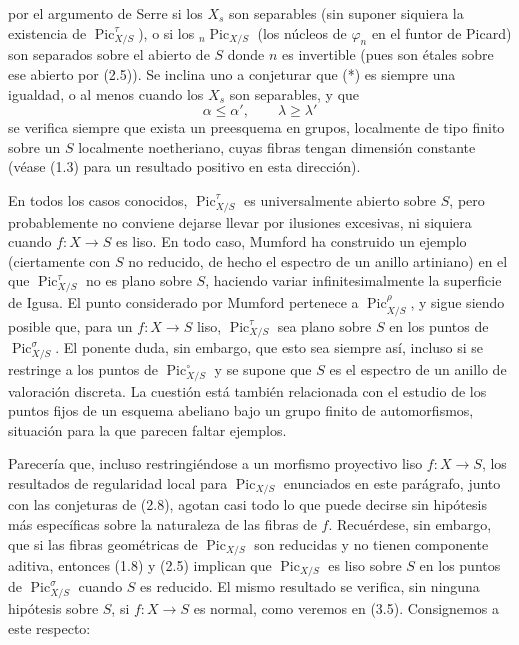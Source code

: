 por el argumento de Serre si los $X_s$ son separables (sin suponer siquiera la
existencia de $\operatorname{Pic}_{X/S}^\tau$), o si los
$ {}_n\operatorname{Pic}_{X/S}$ (los núcleos de $\varphi_n$ en el funtor de
Picard) son separados sobre el abierto de $S$ donde $n$ es invertible (pues son étales sobre ese abierto por (2.5)). Se
inclina uno a conjeturar que (*) es siempre una igualdad, o al menos cuando los
$X_s$ son separables, y que
\[
\tag{***}\alpha\leq\alpha',\qquad\lambda\geq\lambda'
\]
se verifica siempre que exista un preesquema en grupos, localmente de tipo
finito sobre un $S$ localmente noetheriano, cuyas fibras tengan dimensión
constante (véase (1.3) para un resultado positivo en esta dirección).

 En todos los casos conocidos,
$\operatorname{Pic}_{X/S}^\tau$ es universalmente abierto sobre $S$, pero
probablemente no conviene dejarse llevar por ilusiones excesivas, ni siquiera
cuando $f:X\longrightarrow S$ es liso. En todo caso, Mumford ha construido un
ejemplo (ciertamente con $S$ no reducido, de hecho el espectro de un anillo
artiniano) en el que $\operatorname{Pic}_{X/S}^\tau$ no es plano sobre $S$,
haciendo variar infinitesimalmente la superficie de Igusa. El punto considerado
por Mumford pertenece a $\operatorname{Pic}_{X/S}^\rho$, y sigue siendo posible
que, para un $f:X\longrightarrow S$ liso, $\operatorname{Pic}_{X/S}^\tau$ sea
plano sobre $S$ en los puntos de $\operatorname{Pic}_{X/S}^\sigma$. El ponente
duda, sin embargo, que esto sea siempre así, incluso si se restringe a los
puntos de $\operatorname{Pic}_{X/S}^\circ$ y se supone que $S$ es el espectro
de un anillo de valoración discreta. La cuestión está también relacionada con
el estudio de los puntos fijos de un esquema abeliano bajo un grupo finito de
automorfismos, situación para la que parecen faltar ejemplos.

Parecería que, incluso restringiéndose a un morfismo proyectivo liso
$f:X\longrightarrow S$, los resultados de regularidad local para
$\operatorname{Pic}_{X/S}$ enunciados en este parágrafo, junto con las
conjeturas de (2.8), agotan casi todo lo que puede decirse sin hipótesis más
específicas sobre la naturaleza de las fibras de $f$. Recuérdese, sin embargo,
que si las fibras geométricas de $\operatorname{Pic}_{X/S}$ son reducidas y no
tienen componente aditiva, entonces (1.8) y (2.5) implican que
$\operatorname{Pic}_{X/S}$ es liso sobre $S$ en los puntos de
$\operatorname{Pic}_{X/S}^\sigma$ cuando $S$ es reducido. El mismo resultado se
verifica, sin ninguna hipótesis sobre $S$, si $f:X\longrightarrow S$ es normal,
como veremos en (3.5). Consignemos a este respecto:

